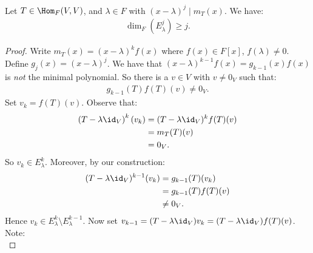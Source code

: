     \begin{theorem}
        Let $T \in \Hom_F{(V,V)}$, and $\lambda \in F$ with $(x-\lambda)^j \mid m_T(x)$. We have:
            \begin{equation*}
            \begin{split}
                \dim_F(E_\lambda^j) \geq j.
            \end{split}
            \end{equation*}
    \end{theorem}
        \begin{proof}
            Write $m_T(x) = (x-\lambda)^k f(x)$ where $f(x) \in F[x]$, $f(\lambda) \neq 0$. Define $g_j(x) = (x-\lambda)^j$. We have that $(x-\lambda)^{k-1}f(x) = g_{k-1}(x)f(x)$ is \textit{not} the minimal polynomial. So there is a $v \in V$ with $v \neq 0_V$ such that:
                \begin{equation*}
                \begin{split}
                    g_{k-1}(T)f(T)(v) \neq 0_V.
                \end{split}
                \end{equation*}
            Set $v_k = f(T)(v)$. Observe that:
                \begin{equation*}
                \begin{split}
                    \left(T - \lambda \id_V\right)^k (v_k)
                    & = (T-\lambda \id_V)^k f(T)(v)\\
                    & = m_T(T)(v) \\
                    & = 0_V.
                \end{split}
                \end{equation*}
            So $v_k \in E_\lambda^k$. Moreover, by our construction:
                \begin{equation*}
                \begin{split}
                    (T-\lambda \id_V)^{k-1}(v_k)
                    & = g_{k-1}(T)(v_k) \\
                    & = g_{k-1}(T)f(T)(v) \\
                    & \neq 0_V.
                \end{split}
                \end{equation*}
            Hence $v_k \in E_\lambda^{k} \setminus E_\lambda^{k-1}$. Now set $v_{k-1} = (T - \lambda \id_V)v_k = (T - \lambda \id_V)f(T)(v)$. Note:
                \begin{equation*}

\end{equation*}
\end{proof}
